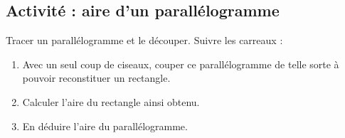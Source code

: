 
\subsection*{Activité : aire d'un parallélogramme}

Tracer un parallélogramme et le découper. Suivre les carreaux :

\begin{center}
   
\end{center}

\begin{enumerate}
    \item
        Avec un seul coup de ciseaux, couper ce parallélogramme de telle sorte à pouvoir reconstituer un rectangle.
    \item
        Calculer l'aire du rectangle ainsi obtenu.
    \item
        En déduire l'aire du parallélogramme.
\end{enumerate}
